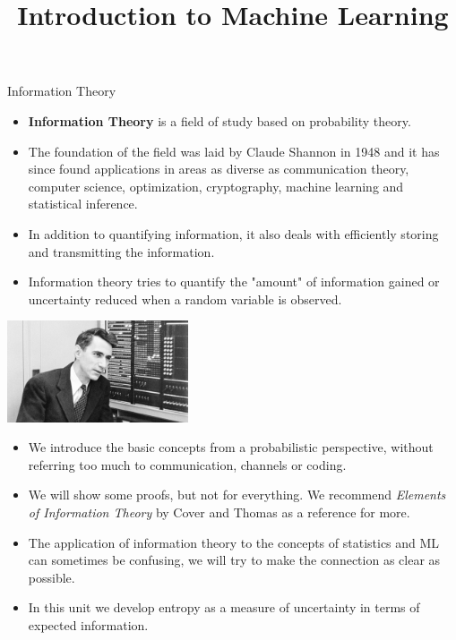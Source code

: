 \documentclass[11pt,compress,t,notes=noshow, xcolor=table]{beamer}
\title{Introduction to Machine Learning}
\date{}
\begin{document}


\begin{vbframe}{Information Theory}

\begin{itemize}
  \item \textbf{Information Theory} is a field of study based on probability theory.
  \item The foundation of the field was laid by Claude Shannon in 1948 and it has since found applications in areas as diverse as communication theory, computer science, optimization, cryptography, machine learning and statistical inference.
  \item In addition to quantifying information, it also deals with efficiently storing and transmitting the information.
  \item Information theory tries to quantify the "amount" of information gained or 
    uncertainty reduced when a random variable is observed.
\end{itemize}

  \begin{center}
\includegraphics[width = 0.4\textwidth]{figure_man/claude-shannon.jpg} \\
\end{center}

\framebreak

\lz
\begin{itemize}
\setlength\itemsep{1.2em}
  \item We introduce the basic concepts from a probabilistic perspective, without referring too much to communication, channels or coding.
  \item We will show some proofs, but not for everything. We recommend 
    \textit{Elements of Information Theory} by Cover and Thomas as a reference for more. 
  \item The application of information theory to the concepts of statistics and ML can sometimes be confusing, we will try to make the connection as clear as possible.
  \item In this unit we develop entropy as a measure of uncertainty in terms of expected information.
\end{itemize}
\end{vbframe}
\end{document}
